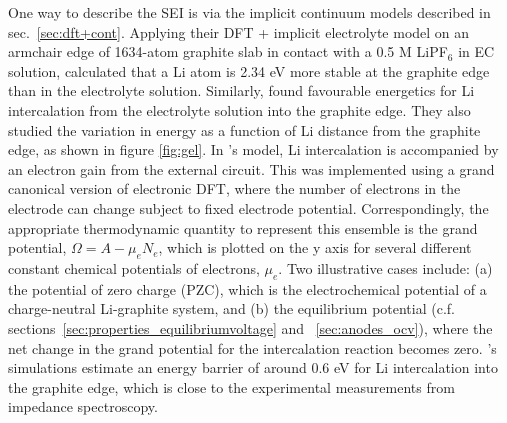 \documentclass[../main.tex]{subfiles}
\begin{document}
One way to describe the SEI is via the implicit continuum models described in sec.~\ref{sec:dft+cont}. Applying their DFT + implicit electrolyte model on an armchair edge of 1634-atom graphite slab in contact with a 0.5 M LiPF$_6$ in EC solution, \citeauthor{Dziedzic2020} calculated that a Li atom is 2.34 eV more stable at the graphite edge than in the electrolyte solution.\cite{Dziedzic2020} Similarly, \citeauthor{haruyama2018} found favourable energetics for Li intercalation from the electrolyte solution into the graphite edge.\cite{haruyama2018} They also studied the variation in energy as a function of Li distance from the graphite edge, as shown in figure \ref{fig:gel}. In \citeauthor{haruyama2018}'s model, Li intercalation is accompanied by an electron gain from the external circuit. This was implemented using a grand canonical version of electronic DFT, where the number of electrons in the electrode can change subject to fixed electrode potential. Correspondingly, the appropriate thermodynamic quantity to represent this ensemble is the grand potential, $\Omega=A-\mu_e N_e$, which is plotted on the y axis for several different constant chemical potentials of electrons, $\mu_e$. Two illustrative cases include: (a) the potential of zero charge (PZC), which is the electrochemical potential of a charge-neutral Li-graphite system, and (b) the equilibrium potential (c.f.  sections~\ref{sec:properties_equilibriumvoltage} and ~\ref{sec:anodes_ocv}), where the net change in the grand potential for the intercalation reaction becomes zero. \citeauthor{haruyama2018}'s simulations estimate an energy barrier of around 0.6 eV for Li intercalation into the graphite edge, which is close to the experimental measurements from impedance spectroscopy.\cite{Yamada2009}
\end{document}
